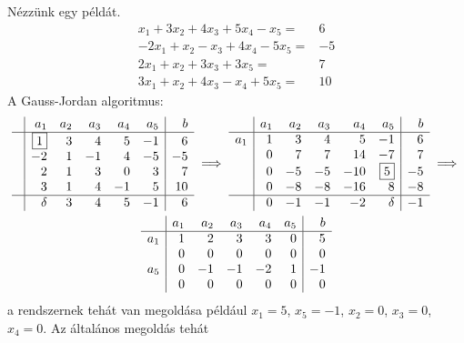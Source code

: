 \documentclass[9pt, showtrims]{memoir}
\theoremstyle{plain}
\theoremstyle{remark}
\theoremstyle{definition}
\begin{document}
Nézzünk egy példát.
\[
    \begin{array}{rl}
        x_1+3x_2+4x_3+5x_4-x_5=&6  \\
        -2x_1+x_2-x_3+4x_4-5x_5=&-5  \\
        2x_1+x_2+3x_3+3x_5=&7  \\
        3x_1+x_2+4x_3-x_4+5x_5=&10 
    \end{array}
\]
A Gauss-Jordan algoritmus:
\begin{multline*}
    \begin{array}{c|rrrrr|r}
        &a_1&a_2&a_3&a_4&a_5&b\\
        \hline
        &\boxed{1}&3&4&5&-1&6\\
        &-2&1&-1&4&-5&-5\\
        &2&1&3&0&3&7\\
        &3&1&4&-1&5&10\\
        \hline
        &\delta&3&4&5&-1&6
    \end{array}
    \implies
    \begin{array}{c|rrrrr|r}
        &a_1&a_2&a_3&a_4&a_5&b\\
        \hline
        a_1&1&3&4&5&-1&6\\
        &0&7&7&14&-7&7\\
        &0&-5&-5&-10&\boxed{5}&-5\\
        &0&-8&-8&-16&8&-8\\
        \hline
        &0&-1&-1&-2&\delta&-1
    \end{array}
    \implies
    \\
    \begin{array}{c|rrrrr|r}
        &a_1&a_2&a_3&a_4&a_5&b\\
        \hline
        a_1&1&2&3&3&0&5\\
        &0&0&0&0&0&0\\
        a_5&0&-1&-1&-2&1&-1\\
        &0&0&0&0&0&0\\
    \end{array}
\end{multline*}
a rendszernek tehát van megoldása például $x_1=5$, $x_5=-1$, $x_2=0$, $x_3=0$, $x_4=0$.
Az általános megoldás tehát
\end{document}
